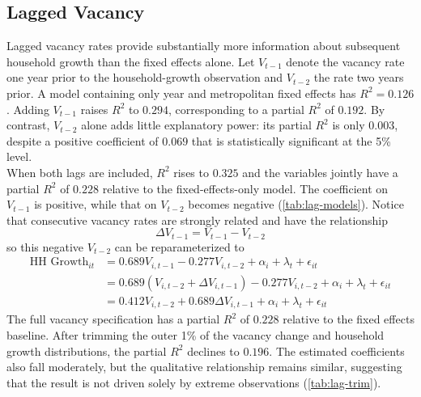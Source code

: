 \documentclass[11pt]{article}
\begin{document}
    \subsection*{Lagged Vacancy}
        Lagged vacancy rates provide substantially more information about subsequent household growth than the fixed effects alone. Let $V_{t-1}$ denote the vacancy rate one year prior to the household-growth observation and $V_{t-2}$ the rate two years prior. A model containing only year and metropolitan fixed effects has $R^2=0.126$. Adding $V_{t-1}$ raises $R^2$ to $0.294$, corresponding to a partial $R^2$ of $0.192$. By contrast, $V_{t-2}$ alone adds little explanatory power: its partial $R^2$ is only $0.003$, despite a positive coefficient of $0.069$ that is statistically significant at the 5\% level. \\
        When both lags are included, $R^2$ rises to $0.325$ and the variables jointly have a partial $R^2$ of $0.228$ relative to the fixed-effects-only model. The coefficient on $V_{t-1}$ is positive, while that on $V_{t-2}$ becomes negative (\autoref{tab:lag-models}). Notice that consecutive vacancy rates are strongly related and have the relationship
        \begin{equation*}
            \Delta V_{t-1}=V_{t-1}-V_{t-2}
        \end{equation*}
        so this negative $V_{t-2}$ can be reparameterized to
        \begin{align*}
        \text{HH Growth}_{it} &= 0.689V_{i,t-1} -0.277V_{i,t-2} +\alpha_i+\lambda_t+\epsilon_{it} \\
            &= 0.689\left(V_{i,t-2}+\Delta V_{i,t-1}\right) -0.277V_{i,t-2} +\alpha_i+\lambda_t+\epsilon_{it} \\
            &= 0.412V_{i,t-2} +0.689\Delta V_{i,t-1} +\alpha_i+\lambda_t+\epsilon_{it}
        \end{align*}
        The full vacancy specification has a partial $R^2$ of $0.228$ relative to the fixed effects baseline. After trimming the outer 1\% of the vacancy change and household growth distributions, the partial $R^2$ declines to $0.196$. The estimated coefficients also fall moderately, but the qualitative relationship remains similar, suggesting that the result is not driven solely by extreme observations (\autoref{tab:lag-trim}).
\end{document}
